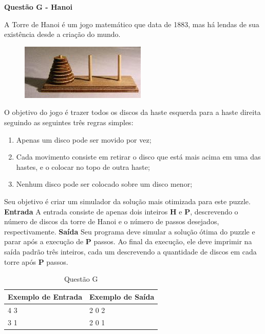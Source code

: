 \documentclass[a4paper, 12pt]{article}
\begin{document}
\newpage %
\begin{center}
\textbf{{\Large Questão G - Hanoi}}
\end{center}
\vspace{5pt}
A Torre de Hanoi é um jogo matemático que data de 1883, mas há lendas de
sua existência desde a criação do mundo.
\begin{figure}[htb]
	\centering
	\includegraphics[scale=0.9]{hanoi.jpg}
\end{figure}
O objetivo do jogo é trazer todos os discos da haste esquerda para a haste
direita seguindo as seguintes três regras simples:
\begin{enumerate}
\item Apenas um disco pode ser movido por vez;
\item Cada movimento consiste em retirar o disco que está mais acima em uma das hastes, e o colocar no topo de outra haste;
\item Nenhum disco pode ser colocado sobre um disco menor;
\end{enumerate}
Seu objetivo é criar um simulador da solução mais otimizada para este
puzzle.
\newline \newline
\textbf{{\large Entrada}} \newline
A entrada consiste de apenas dois inteiros \textbf{H} e \textbf{P}, descrevendo o número de
discos da torre de Hanoi e o número de passos desejados, respectivamente.
\newline \newline
\textbf{{\large Saída}} \newline
Seu programa deve simular a solução ótima do puzzle e parar após a
execução de \textbf{P} passos. Ao final da execução, ele deve imprimir na saída
padrão três inteiros, cada um descrevendo a quantidade de discos em cada
torre após \textbf{P} passos.
\newline
\begin{table}[H]
\centering
\begin{tabular}{|l|l|}
\hline
\textbf{Exemplo de Entrada} & \textbf{Exemplo de Saída} \\ \hline
4 3                         & 2 0 2                     \\ \hline
3 1                         & 2 0 1                     \\ \hline
\end{tabular}
\caption{Questão G}
\label{tabela7}
\end{table}
\end{document}
